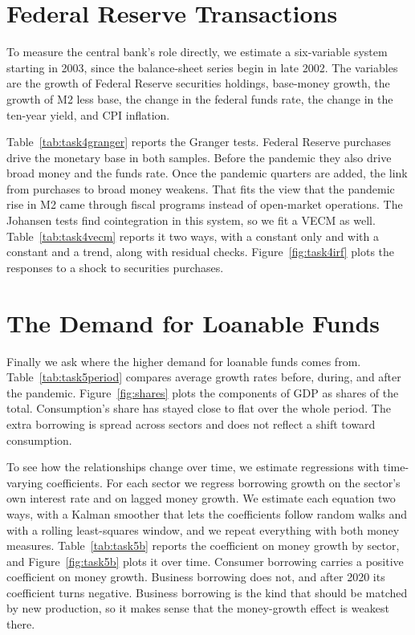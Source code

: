 \section{Federal Reserve Transactions}
\label{sec:fed}

To measure the central bank's role directly, we estimate a six-variable system starting in 2003, since the balance-sheet series begin in late 2002. The variables are the growth of Federal Reserve securities holdings, base-money growth, the growth of M2 less base, the change in the federal funds rate, the change in the ten-year yield, and CPI inflation.

Table~\ref{tab:task4granger} reports the Granger tests. Federal Reserve purchases drive the monetary base in both samples. Before the pandemic they also drive broad money and the funds rate. Once the pandemic quarters are added, the link from purchases to broad money weakens. That fits the view that the pandemic rise in M2 came through fiscal programs instead of open-market operations. The Johansen tests find cointegration in this system, so we fit a VECM as well. Table~\ref{tab:task4vecm} reports it two ways, with a constant only and with a constant and a trend, along with residual checks. Figure~\ref{fig:task4irf} plots the responses to a shock to securities purchases.

\section{The Demand for Loanable Funds}
\label{sec:loanable}

Finally we ask where the higher demand for loanable funds comes from. Table~\ref{tab:task5period} compares average growth rates before, during, and after the pandemic. Figure~\ref{fig:shares} plots the components of GDP as shares of the total. Consumption's share has stayed close to flat over the whole period. The extra borrowing is spread across sectors and does not reflect a shift toward consumption.

To see how the relationships change over time, we estimate regressions with time-varying coefficients. For each sector we regress borrowing growth on the sector's own interest rate and on lagged money growth. We estimate each equation two ways, with a Kalman smoother that lets the coefficients follow random walks and with a rolling least-squares window, and we repeat everything with both money measures. Table~\ref{tab:task5b} reports the coefficient on money growth by sector, and Figure~\ref{fig:task5b} plots it over time. Consumer borrowing carries a positive coefficient on money growth. Business borrowing does not, and after 2020 its coefficient turns negative. Business borrowing is the kind that should be matched by new production, so it makes sense that the money-growth effect is weakest there.


